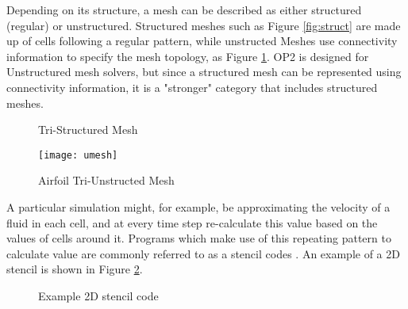 \clearpage
Depending on its structure, a mesh can be described as either structured (regular) or unstructured. Structured meshes such as Figure \ref{fig:struct} are made up of cells following a regular pattern, while unstructed Meshes use connectivity information to specify the mesh topology, as Figure \ref{fig:umesh}. OP2 is designed for Unstructured mesh solvers, but since a structured mesh can be represented using connectivity information, it is a "stronger" category that includes structured meshes.
\vspace{.5cm}
\begin{figure}[h!]
  \begin{minipage}{.5\textwidth}
    \centering
    \caption{Tri-Structured Mesh}
    \label{fig:struct}
  \end{minipage}
  \begin{minipage}{.5\textwidth}
    \centering
    \texttt{[image: umesh]}
    \caption{Airfoil Tri-Unstructed Mesh}
    \label{fig:umesh}
  \end{minipage}
\end{figure}
\par
A particular simulation might, for example, be approximating the velocity of a fluid in each cell, and at every time step re-calculate this value based on the values of cells around it. Programs which make use of this repeating pattern to calculate value are commonly referred to as a stencil codes \cite{stencil}. An example of a 2D stencil is shown in Figure \ref{fig:stencil}.
\vspace{.5cm}
\begin{figure}[h!]
  \centering
{}
\caption{Example 2D stencil code}
\label{fig:stencil}
\end{figure}

